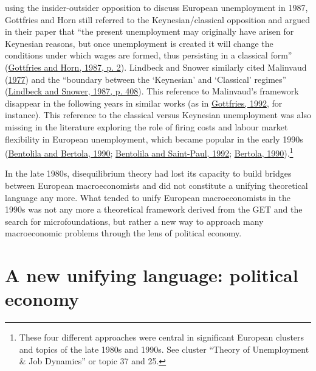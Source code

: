 \documentclass[
]{article}
\begin{document}
using the insider-outsider opposition to discuss European unemployment
in 1987, Gottfries and Horn still referred to the Keynesian/classical
opposition and argued in their paper that ``the present unemployment may
originally have arisen for Keynesian reasons, but once unemployment is
created it will change the conditions under which wages are formed, thus
persisting in a classical form''
(\protect\hyperlink{ref-gottfries1987}{Gottfries and Horn, 1987, p. 2}).
Lindbeck and Snower similarly cited Malinvaud
(\protect\hyperlink{ref-malinvaud1977}{1977}) and the ``boundary between
the `Keynesian' and `Classical' regimes''
(\protect\hyperlink{ref-lindbeck1987a}{Lindbeck and Snower, 1987, p.
408}). This reference to Malinvaud's framework disappear in the
following years in similar works (as in
\protect\hyperlink{ref-gottfries1992}{Gottfries, 1992}, for instance).
This reference to the classical versus Keynesian unemployment was also
missing in the literature exploring the role of firing costs and labour
market flexibility in European unemployment, which became popular in the
early 1990s (\protect\hyperlink{ref-bentolila1990}{Bentolila and
Bertola, 1990}; \protect\hyperlink{ref-bentolila1992a}{Bentolila and
Saint-Paul, 1992}; \protect\hyperlink{ref-bertola1990a}{Bertola,
1990}).\footnote{These four different approaches were central in
  significant European clusters and topics of the late 1980s and 1990s.
  See cluster ``Theory of Unemployment \& Job Dynamics'' or topic 37 and
  25.}

In the late 1980s, disequilibrium theory had lost its capacity to build
bridges between European macroeconomists and did not constitute a
unifying theoretical language any more. What tended to unify European
macroeconomists in the 1990s was not any more a theoretical framework
derived from the GET and the search for microfoundations, but rather a
new way to approach many macroeconomic problems through the lens of
political economy.

\hypertarget{political-economics}{%
\section{A new unifying language: political
economy}\label{political-economics}}
\end{document}
